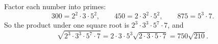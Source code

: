 Factor each number into primes:
\[300=2^2\cdot3\cdot5^2,\qquad 450=2\cdot3^2\cdot5^2,\qquad 875=5^3\cdot7 .\]
So the product under one square root is $2^3\cdot3^3\cdot5^7\cdot7$, and
\[\sqrt{2^3\cdot3^3\cdot5^7\cdot7}=2\cdot3\cdot5^3\sqrt{2\cdot3\cdot5\cdot7}=\boxed{750\sqrt{210}}.\]
